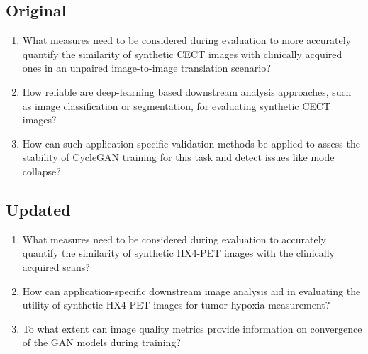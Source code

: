 \subsection{Original}
\begin{enumerate}
    \item What measures need to be considered during evaluation to more accurately quantify the similarity of synthetic CECT images with clinically acquired ones in an unpaired image-to-image translation scenario?
    \item How reliable are deep-learning based downstream analysis approaches, such as image classification or segmentation, for evaluating synthetic CECT images?
    \item How can such application-specific validation methods be applied to assess the stability of CycleGAN training for this task and detect issues like mode collapse?
\end{enumerate}


\subsection{Updated}
\label{updated_research_questions}

\begin{enumerate}
    \item What measures need to be considered during evaluation to accurately quantify the similarity of synthetic HX4-PET images with the clinically acquired scans?
    \item How can application-specific downstream image analysis aid in evaluating the utility of synthetic HX4-PET images for tumor hypoxia measurement?
    \item To what extent can image quality metrics provide information on convergence of the GAN models during training?
\end{enumerate}

